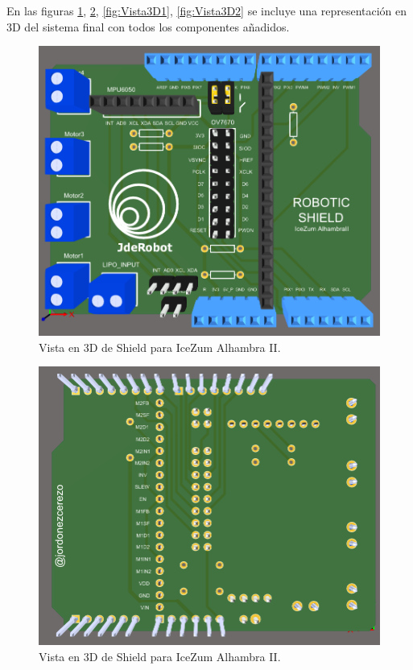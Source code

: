 	En las figuras \ref{fig:top_3D}, \ref{fig:bottom_3D}, \ref{fig:Vista3D1}, \ref{fig:Vista3D2} se incluye una representación en 3D del sistema final con todos los componentes añadidos.
	
	\begin{center}
		\begin{figure}[H]
			\center
			\includegraphics[scale=0.6]{imagenes/Balancing_Robot/top_3D.PNG}
			\caption{Vista en 3D de Shield para IceZum Alhambra II.}
			\label{fig:top_3D}
		\end{figure}
	\end{center}
	
	\begin{center}
		\begin{figure}[H]
			\center
			\includegraphics[scale=0.6]{imagenes/Balancing_Robot/bottom_3D.PNG}
			\caption{Vista en 3D de Shield para IceZum Alhambra II.}
			\label{fig:bottom_3D}
		\end{figure}
	\end{center}
	
